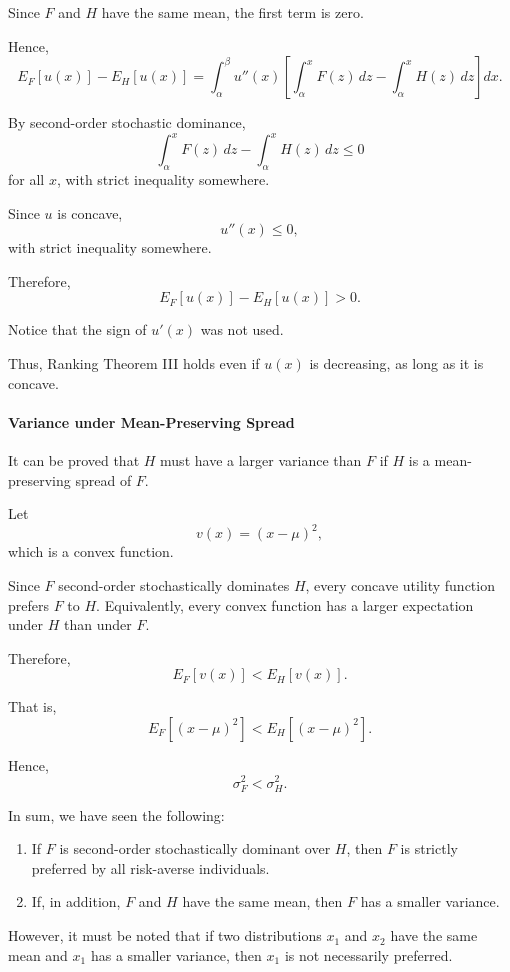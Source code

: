 Since \(F\) and \(H\) have the same mean, the first term is zero.

Hence,
\[
E_F[u(x)]-E_H[u(x)]
=
\int_{\alpha}^{\beta}
u''(x)
\left[
\int_{\alpha}^{x}F(z)\,dz
-
\int_{\alpha}^{x}H(z)\,dz
\right]dx.
\]

By second-order stochastic dominance,
\[
\int_{\alpha}^{x}F(z)\,dz
-
\int_{\alpha}^{x}H(z)\,dz
\le 0
\]
for all \(x\), with strict inequality somewhere.

Since \(u\) is concave,
\[
u''(x)\le 0,
\]
with strict inequality somewhere.

Therefore,
\[
E_F[u(x)]-E_H[u(x)]>0.
\]

Notice that the sign of \(u'(x)\) was not used.

Thus, Ranking Theorem III holds even if \(u(x)\) is decreasing, as long as it is concave.

\paragraph{Variance under Mean-Preserving Spread}

It can be proved that \(H\) must have a larger variance than \(F\) if \(H\) is a mean-preserving spread of \(F\).

Let
\[
v(x)=(x-\mu)^2,
\]
which is a convex function.

Since \(F\) second-order stochastically dominates \(H\), every concave utility function prefers \(F\) to \(H\). Equivalently, every convex function has a larger expectation under \(H\) than under \(F\).

Therefore,
\[
E_F[v(x)]<E_H[v(x)].
\]

That is,
\[
E_F[(x-\mu)^2]
<
E_H[(x-\mu)^2].
\]

Hence,
\[
\sigma_F^2<\sigma_H^2.
\]




In sum, we have seen the following:

\begin{enumerate}
    \item If \(F\) is second-order stochastically dominant over \(H\), then \(F\) is strictly preferred by all risk-averse individuals.
    
    \item If, in addition, \(F\) and \(H\) have the same mean, then \(F\) has a smaller variance.
\end{enumerate}

However, it must be noted that if two distributions \(x_1\) and \(x_2\) have the same mean and \(x_1\) has a smaller variance, then \(x_1\) is not necessarily preferred.

